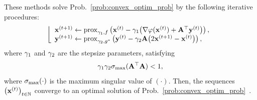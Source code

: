 These methods solve Prob.~\eqref{prob:convex_optim_prob} by the following iterative procedures:
\begin{equation}
	\label{algo:PDS}
	\left\lfloor 
		\begin{array}{l}
			\mathbf{x}^{(t+1)} 
			\leftarrow \operatorname{prox}_{\gamma_{1}, f}
			\left( \mathbf{x}^{(t)} - \gamma_{1} \bigl( \nabla \varphi(\mathbf{x}^{(t)}) + \mathbf{A}^{\top} \mathbf{y}^{(t)} \bigr) \right), \\
			\mathbf{y}^{(t+1)}
			\leftarrow \operatorname{prox}_{\gamma_{2}, g^{*}}
			\left( \mathbf{y}^{(t)} - \gamma_{2}
			\mathbf{A} \bigl(2\mathbf{x}^{(t+1)} - \mathbf{x}^{(t)} \bigr) \right), \\
		\end{array}
	 \right.
\end{equation}
where $\gamma_{1}$ and $\gamma_{2}$ are the stepsize parameters, satisfying
\begin{equation}
	\label{ieq:PDS_ConvergenceCondition}
	\gamma_{1} \gamma_{2} \sigma_{\text{max}} (\mathbf{A}^{\top}\mathbf{A}) < 1,
\end{equation}
where $\sigma_{\text{max}} (\cdot)$ is the maximum singular value of $(\cdot)$. Then, the sequences $\left( \mathbf{x}^{(t)} \right)_{t \in \mathbb{N}}$ converge to an optimal solution of Prob.~\eqref{prob:convex_optim_prob}~\cite{Chambolle2011PDS, Condat2013PDS}.


